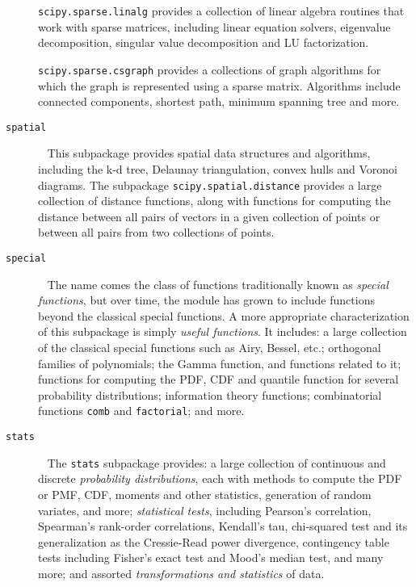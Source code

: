 \begin{description}
    \texttt{scipy.sparse.linalg} provides a collection of linear algebra
    routines that work with sparse matrices, including linear equation
    solvers, eigenvalue decomposition, singular value decomposition
    and LU factorization.

    \texttt{scipy.sparse.csgraph} provides a collections of graph algorithms
    for which the graph is represented using a sparse matrix.  Algorithms
    include connected components, shortest path, minimum spanning tree
    and more.
\item[\texttt{spatial}] ~ \newline
    This subpackage provides spatial data structures and algorithms,
    including the k-d tree, Delaunay triangulation, convex hulls and Voronoi
    diagrams.  The subpackage \texttt{scipy.spatial.distance} provides
    a large collection of distance functions, along with functions for
    computing the distance between all pairs of vectors in a given collection
    of points or between all pairs from two collections of points.
\item[\texttt{special}] ~ \newline
    The name comes the class of functions traditionally known as \emph{special
    functions}, but over time, the module has grown to include functions
    beyond the classical special functions.  A more appropriate characterization
    of this subpackage is simply \emph{useful functions}.
    It includes: a large collection of the classical special functions
    such as Airy, Bessel, etc.; orthogonal families of polynomials;
    the Gamma function, and functions related to it;
    functions for computing the PDF, CDF and quantile function for several
    probability distributions;
    information theory functions;
    combinatorial functions \texttt{comb} and \texttt{factorial};
    and more.
\item[\texttt{stats}] ~ \newline
    The \texttt{stats} subpackage provides: a large collection of continuous
    and discrete \emph{probability distributions}, each with methods to compute
    the PDF or PMF, CDF, moments and other statistics, generation of random
    variates, and more;
    \emph{statistical tests}, including Pearson's correlation, Spearman's rank-order
    correlations, Kendall's tau, chi-squared test and its generalization as the
    Cressie-Read power divergence, contingency table tests including Fisher's
    exact test and Mood's median test, and many more;
    and assorted \emph{transformations and statistics} of data.
\end{description}
